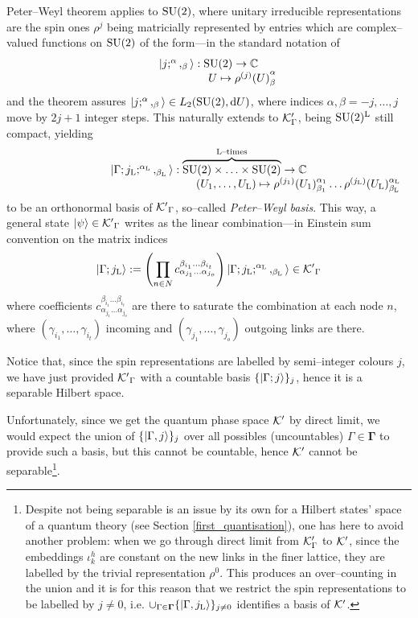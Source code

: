 {Peter--Weyl theorem applies to $\text{\normalfont SU}(2)$, where unitary irreducible representations are the spin ones $\rho^j$ being matricially represented by entries which are complex--valued functions on $\text{\normalfont SU}(2)$ of the form---in the standard notation of \cite{rov1}}
{
$$\begin{matrix}
    \left| j;^\alpha,_\beta \right >:\text{\normalfont SU}(2)\to\mathbb{C}\\
    \qquad\qquad\qquad U\mapsto{\rho^{(j)}(U)}^\alpha_\beta
\end{matrix}$$}
{and the theorem assures $\left| j;^\alpha,_\beta \right >\in L_2(\text{\normalfont SU}(2),\text{\normalfont d} U)$, where indices $\alpha,\beta=-j,\hdots,j$ move by $2j+1$ integer steps. This naturally extends to $\mathcal{K}'_\Gamma$, being $\text{\normalfont SU}(2)^{\text{\normalfont L}}$ still compact, yielding}
{$$\begin{matrix}
    \left| \Gamma;j_{\text{\normalfont L}};^{\alpha_{\text{\normalfont L}}},_{\beta_{\text{\normalfont L}}} \right >:\overbrace{\text{\normalfont SU}(2)\times\hdots\times\text{\normalfont SU}(2)}^{\text{\normalfont L}\text{--times}}\to\mathbb{C}\\
    \qquad\qquad\qquad\qquad\qquad\qquad\qquad\qquad (U_1,\hdots,U_{\text{\normalfont L}})\mapsto\rho^{(j_1)}(U_1)^{\alpha_1}_{\beta_1}\hdots\rho^{(j_{\text{\normalfont L}})}(U_{\text{\normalfont L}})^{\alpha_{\text{\normalfont L}}}_{\beta_{\text{\normalfont L}}}
\end{matrix}$$}
{to be an orthonormal basis of ${\mathcal{K}'}_\Gamma$, so--called \emph{Peter--Weyl basis}. This way, a general state $\left| \psi \right >\in{\mathcal{K}'}_\Gamma$ writes as the linear combination---in Einstein sum convention on the matrix indices
$$\left| \Gamma;j_{\text{\normalfont L}} \right >:=\left(\prod_{n\in N}c^{\beta_{i_1}\hdots\beta_{i_t}}_{\alpha_{j_1}\hdots\alpha_{j_o}}\right)\left| \Gamma;j_{\text{\normalfont L}};^{\alpha_{\text{\normalfont L}}},_{\beta_{\text{\normalfont L}}} \right >\in{\mathcal{K}'}_\Gamma$$
where coefficients $c^{\beta_{i_1}\hdots\beta_{i_t}}_{\alpha_{j_1}\hdots\alpha_{j_o}}$ are there to saturate the combination at each node $n$, where $(\gamma_{i_1},\hdots,\gamma_{i_t})$ incoming and $(\gamma_{j_1},\hdots,\gamma_{j_o})$ outgoing links are there. }

{Notice that, since the spin representations are labelled by semi--integer colours $j$, we have just provided ${\mathcal{K}'}_\Gamma$ with a countable basis $\{\left| \Gamma;j \right >\}_{j}$, hence it is a separable Hilbert space. }

{Unfortunately, since we get the quantum phase space $\mathcal{K}'$ by direct limit, we would expect the union of $\{\left| \Gamma,j \right >\}_j$ over all possibles (uncountables) $\Gamma\in\boldsymbol{\Gamma}$ to provide such a basis, but this cannot be countable, hence $\mathcal{K}'$ cannot be separable\footnote{{Despite not being separable is an issue by its own for a Hilbert states' space of a quantum theory (see Section \ref{first_quantisation}), one has here to avoid another problem: when we go through direct limit from $\mathcal{K}'_\Gamma$ to $\mathcal{K}'$, since the embeddings $\iota^h_k$ are constant on the new links in the finer lattice, they are labelled by the trivial representation $\rho^0$. This produces an over--counting in the union and it is for this reason that we restrict the spin representations to be labelled by $j\neq0$, i.e. $\cup_{\Gamma\in\boldsymbol{\Gamma}}\{\left| \Gamma,j_{\text{\normalfont L}} \right >\}_{j\neq0}$ identifies a basis of $\mathcal{K}'$.}}.}


